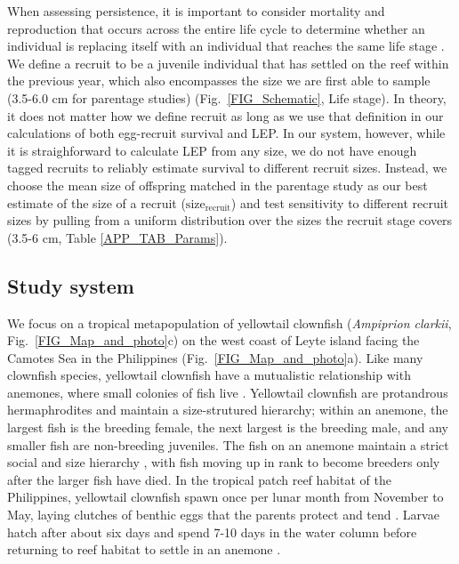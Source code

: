 \documentclass[12pt, oneside]{article}   	%
\begin{document}
When assessing persistence, it is important to consider mortality and reproduction that occurs across the entire life cycle to determine whether an individual is replacing itself with an individual that reaches the same life stage \citep{burgess2014beyond}. We define a recruit to be a juvenile individual that has settled on the reef within the previous year, which also encompasses the size we are first able to sample (3.5-6.0 cm for parentage studies) (Fig.\ \ref{FIG_Schematic}, Life stage). In theory, it does not matter how we define recruit as long as we use that definition in our calculations of both egg-recruit survival and LEP. In our system, however, while it is straighforward to calculate LEP from any size, we do not have enough tagged recruits to reliably estimate survival to different recruit sizes. Instead, we choose the mean size of offspring matched in the parentage study as our best estimate of the size of a recruit ($\text{size}_\text{recruit}$) and test sensitivity to different recruit sizes by pulling from a uniform distribution over the sizes the recruit stage covers (3.5-6 cm, Table \ref{APP_TAB_Params}).

\subsection*{Study system}

We focus on a tropical metapopulation of yellowtail clownfish (\textit{Ampiprion clarkii}, Fig.\ \ref{FIG_Map_and_photo}c) on the west coast of Leyte island facing the Camotes Sea in the Philippines (Fig.\ \ref{FIG_Map_and_photo}a). Like many clownfish species, yellowtail clownfish have a mutualistic relationship with anemones, where small colonies of fish live \citep{buston2003social, fautin1992field}. Yellowtail clownfish are protandrous hermaphrodites and maintain a size-strutured hierarchy; within an anemone, the largest fish is the breeding female, the next largest is the breeding male, and any smaller fish are non-breeding juveniles. The fish on an anemone maintain a strict social and size hierarchy \citep{buston2003social}, with fish moving up in rank to become breeders only after the larger fish have died. In the tropical patch reef habitat of the Philippines, yellowtail clownfish spawn once per lunar month from November to May, laying clutches of benthic eggs that the parents protect and tend \citep{ochi1989mating, holtswarth2017fecundity}. Larvae hatch after about six days and spend 7-10 days in the water column before returning to reef habitat to settle in an anemone \citep{fautin1992field}.
\end{document}
